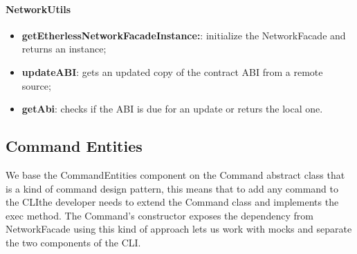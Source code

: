 \paragraph{NetworkUtils}
\begin{itemize}
    \item \textbf{getEtherlessNetworkFacadeInstance:}: initialize the NetworkFacade and returns an instance;
    \item \textbf{updateABI}: gets an updated copy of the contract ABI from a remote source;
    \item \textbf{getAbi}: checks if the ABI is due for an update or returs the local one.
\end{itemize}
\newpage
\subsection{Command Entities}
We base the CommandEntities component on the Command abstract class that is a kind of command design pattern, this means that to add any command to the CLI\glo the developer needs to extend the Command class and implements the exec method.
The Command's constructor exposes the dependency from NetworkFacade using this kind of approach lets us work with mocks and separate the two components of the CLI\glo.
